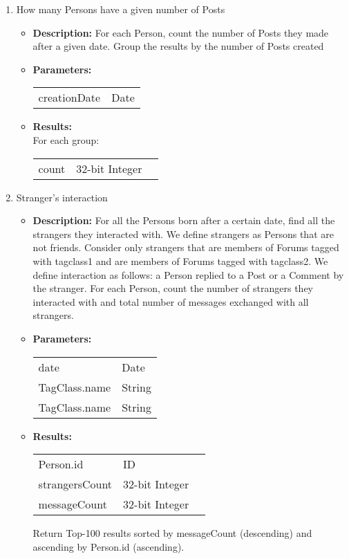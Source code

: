 {\begin{enumerate}
      \item How many Persons have a given number of Posts 
            \begin{itemize}
                \item \textbf{Description:}
                  For each Person, count the number of Posts they made after a given date.
                  Group the results by the number of Posts created 
                \item \textbf{Parameters:} \\
                    \begin{tabular}{ll}
                      creationDate & Date \\
                    \end{tabular}
                \item \textbf{Results:} \\
                  For each group:
                    \begin{tabular}{lll}
                      count & 32-bit Integer 
                    \end{tabular}
                    \end{itemize}

                  \item Stranger's interaction 
            \begin{itemize}
                \item \textbf{Description:}
For all the Persons born after a certain date, find all the strangers they interacted with. We define strangers as
Persons that are not friends.  Consider only strangers that are members of Forums tagged with tagclass1 and are members
of Forums tagged with tagclass2.  We define interaction as follows: a Person replied to a Post or a Comment by the
stranger.  For each Person, count the number of strangers they interacted with and total number of messages exchanged
with all strangers.
                \item \textbf{Parameters:} \\
                    \begin{tabular}{ll}
                      date & Date \\
                      TagClass.name & String \\
                      TagClass.name & String \\
                    \end{tabular}
                \item \textbf{Results:} \\
                    \begin{tabular}{lll}
                      Person.id & ID & \\
                      strangersCount & 32-bit Integer & \\
                      messageCount & 32-bit Integer & \\
                    \end{tabular}
                    Return Top-100 results sorted by messageCount (descending) and ascending by Person.id (ascending).
                    \end{itemize}


\end{enumerate}}
